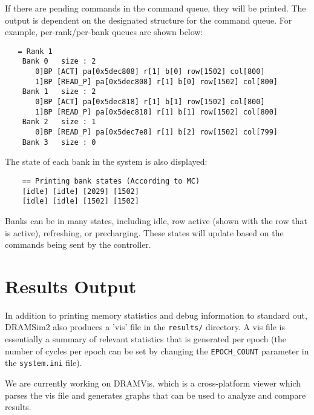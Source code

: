 \documentclass[11pt]{article}
\begin{document}
If there are pending commands in the command queue, they will be
printed.  The output is dependent on the designated structure for
the command queue.  For example, per-rank/per-bank queues are 
shown below:
\begin{lstlisting}
   = Rank 1
    Bank 0   size : 2
       0]BP [ACT] pa[0x5dec808] r[1] b[0] row[1502] col[800]
       1]BP [READ_P] pa[0x5dec808] r[1] b[0] row[1502] col[800]
    Bank 1   size : 2
       0]BP [ACT] pa[0x5dec818] r[1] b[1] row[1502] col[800]
       1]BP [READ_P] pa[0x5dec818] r[1] b[1] row[1502] col[800]
    Bank 2   size : 1
       0]BP [READ_P] pa[0x5dec7e8] r[1] b[2] row[1502] col[799]
    Bank 3   size : 0
\end{lstlisting}

The state of each bank in the system is also displayed:
\begin{lstlisting}
    == Printing bank states (According to MC)
    [idle] [idle] [2029] [1502] 
    [idle] [idle] [1502] [1502] 
\end{lstlisting}
Banks can be in many states, including idle, row active (shown
with the row that is active), refreshing, or precharging.  These
states will update based on the commands being sent by the 
controller.  

\section{Results Output}

In addition to printing memory statistics and debug information to standard out, DRAMSim2 also produces
a 'vis' file in the \texttt{results/} directory. A vis file is essentially a summary of relevant statistics that is generated
per epoch (the number of cycles per epoch can be set by changing the \texttt{EPOCH\_COUNT} parameter in the \texttt{system.ini} file). 

We are currently working on DRAMVis, which is a cross-platform viewer which parses the vis file and generates graphs that can be used
to analyze and compare results.
\end{document}
